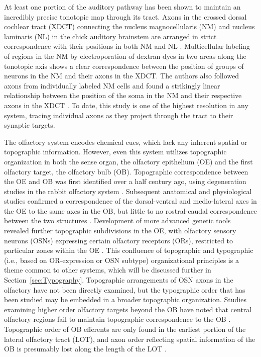 At least one portion of the auditory pathway has been shown to maintain an incredibly precise tonotopic map through its tract. 
Axons in the crossed dorsal cochlear tract (XDCT) connecting the nucleus magnocellularis (NM) and nucleus laminaris (NL) in the chick auditory brainstem are arranged in strict correspondence with their positions in both NM and NL \cite{kashima2013pre}. 
Multicellular labeling of regions in the NM by electroporation of dextran dyes in two areas along the tonotopic axis shows a clear correspondence between the position of groups of neurons in the NM and their axons in the XDCT. 
The authors also followed axons from individually labeled NM cells and found a strikingly linear relationship between the position of the soma in the NM and their respective axons in the XDCT \cite{kashima2013pre}. 
To date, this study is one of the highest resolution in any system, tracing individual axons as they project through the tract to their synaptic targets. 

The olfactory system encodes chemical cues, which lack any inherent spatial or topographic information.
However, even this system utilizes topographic organization in both the sense organ, the olfactory epithelium (OE) and the first olfactory target, the olfactory bulb (OB).
Topographic correspondence between the OE and OB was first identified over a half century ago, using degeneration studies in the rabbit olfactory system \cite{clark1951projection}.
Subsequent anatomical and physiological studies confirmed a correspondence of the dorsal-ventral and medio-lateral axes in the OE to the same axes in the OB, but little to no rostral-caudal correspondence between the two structures \cite{costanzo1978spatially,land1973localized,saucier1986analysis}.
Development of more advanced genetic tools revealed further topographic subdivisions in the OE, with olfactory sensory neurons (OSNs) expressing certain olfactory receptors (ORs), restricted to particular zones within the OE \cite{ressler1993zonal,vassar1993spatial}.
This confluence of topographic and typographic (i.e., based on OR-expression or OSN subtype) organizational principles is a theme common to other systems, which will be discussed further in Section~\ref{sec:Typography}.
Topographic arrangements of OSN axons in the olfactory have not been directly examined, but the typographic order that has been studied may be embedded in a broader topographic organization.
Studies examining higher order olfactory targets beyond the OB have noted that central olfactory regions fail to maintain topographic correspondence to the OB \cite{luskin1982distribution,sosulski2011distinct}.
Topographic order of OB efferents are only found in the earliest portion of the lateral olfactory tract (LOT), and axon order reflecting spatial information of the OB is presumably lost along the length of the LOT \cite{price1975observation}.

